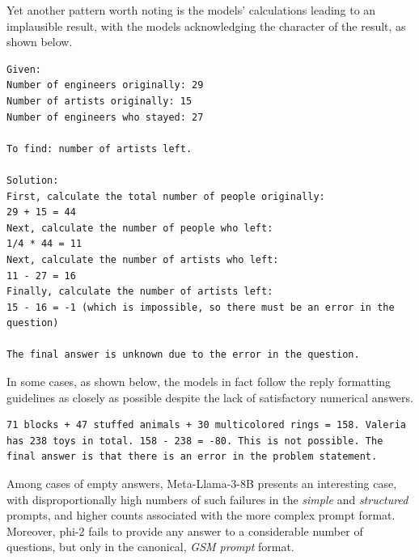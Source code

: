 \documentclass[11pt]{article}
\begin{document}
Yet another pattern worth noting is the models' calculations leading to an implausible result, with the models acknowledging the character of the result, as shown below.

\begin{lstlisting}[caption={Meta-Llama-3-8B-Instruct's answer to question: ``\textit{At the beginning of the conference, there were 29 engineers and 15 artists. After an hour, one-fourth of the total number of people left. How many artists are left if 27 engineers stayed at the conference?}''.}]
Given:
Number of engineers originally: 29
Number of artists originally: 15
Number of engineers who stayed: 27

To find: number of artists left.

Solution:
First, calculate the total number of people originally:
29 + 15 = 44
Next, calculate the number of people who left:
1/4 * 44 = 11
Next, calculate the number of artists who left:
11 - 27 = 16
Finally, calculate the number of artists left:
15 - 16 = -1 (which is impossible, so there must be an error in the question)

The final answer is unknown due to the error in the question.
\end{lstlisting}

In some cases, as shown below, the models in fact follow the reply formatting guidelines as closely as possible despite the lack of satisfactory numerical answers.

\begin{lstlisting}[caption={Mistral-7B Instruct-v0.1's answer to question: ``\textit{When Valeria watches her nephew, she gets out a variety of toys for him. The bag of building blocks has 71 blocks in it. The bin of stuffed animals has 47 stuffed animals inside. The tower of stacking rings has 30 multicolored rings on it. Valeria recently bought a tube of bouncy balls, bringing her total number of toys for her nephew up to 238. How many bouncy balls came in the tube?}''.}]
71 blocks + 47 stuffed animals + 30 multicolored rings = 158. Valeria has 238 toys in total. 158 - 238 = -80. This is not possible. The final answer is that there is an error in the problem statement.
\end{lstlisting}

Among cases of empty answers, Meta-Llama-3-8B presents an interesting case, with disproportionally high numbers of such failures in the \textit{simple} and \textit{structured} prompts, and higher counts associated with the more complex prompt format. Moreover, phi-2 fails to provide any answer to a considerable number of questions, but only in the canonical, \textit{GSM prompt} format.
\end{document}
